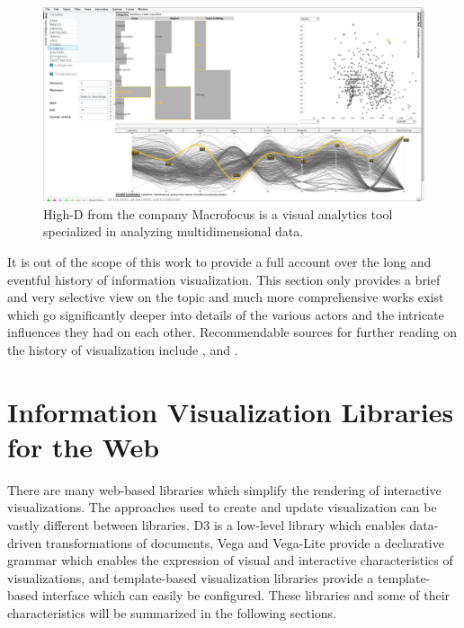 \begin{figure}[tp]
\centering
\includegraphics[keepaspectratio,width=\linewidth,height=\fullh / 3]{images/high-d.png}
\caption[Screenshot of High-D]{
  High-D from the company Macrofocus is a visual analytics tool specialized in analyzing multidimensional data.
   
}
\label{fig:HighD}
\end{figure}

It is out of the scope of this work to provide a full account over the long and eventful history of information visualization.
This section only provides a brief and very selective view on the topic and much more comprehensive works exist which go significantly deeper into details of the various actors and the intricate influences they had on each other.
Recommendable sources for further reading on the history of visualization include \cite{BriefHistoryOfDataVis}, \cite{HistoryOfDataVisAndGraphicCommunication} and \cite{HistoryOfInformationGraphics}.

\section{Information Visualization Libraries for the Web}

There are many web-based libraries which simplify the rendering of interactive visualizations.
The approaches used to create and update visualization can be vastly different between libraries.
D3 is a low-level library which enables data-driven transformations of documents, Vega and Vega-Lite provide a declarative grammar which enables the expression of visual and interactive characteristics of visualizations, and template-based visualization libraries provide a template-based interface which can easily be configured.
These libraries and some of their characteristics will be summarized in the following sections.

